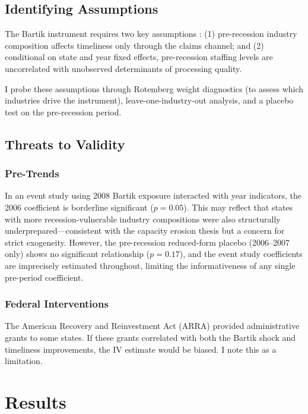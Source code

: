 \documentclass[12pt]{article}
\begin{document}
\subsection{Identifying Assumptions}

The Bartik instrument requires two key assumptions \citep{goldsmithpinkham2020, borusyak2022}: (1) pre-recession industry composition affects timeliness only through the claims channel; and (2) conditional on state and year fixed effects, pre-recession staffing levels are uncorrelated with unobserved determinants of processing quality.

I probe these assumptions through Rotemberg weight diagnostics (to assess which industries drive the instrument), leave-one-industry-out analysis, and a placebo test on the pre-recession period.

\subsection{Threats to Validity}

\subsubsection*{Pre-Trends} In an event study using 2008 Bartik exposure interacted with year indicators, the 2006 coefficient is borderline significant ($p = 0.05$). This may reflect that states with more recession-vulnerable industry compositions were also structurally underprepared---consistent with the capacity erosion thesis but a concern for strict exogeneity. However, the pre-recession reduced-form placebo (2006--2007 only) shows no significant relationship ($p = 0.17$), and the event study coefficients are imprecisely estimated throughout, limiting the informativeness of any single pre-period coefficient.

\subsubsection*{Federal Interventions} The American Recovery and Reinvestment Act (ARRA) provided administrative grants to some states. If these grants correlated with both the Bartik shock and timeliness improvements, the IV estimate would be biased. I note this as a limitation.

\section{Results}
\end{document}
